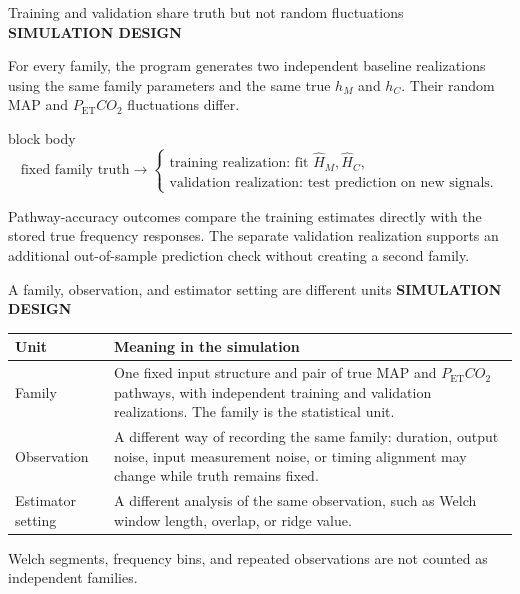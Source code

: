 \documentclass[aspectratio=169,11pt]{beamer}
\newcommand{\PETCOtwo}{P_{\mathrm{ET}}CO_2}
\newcommand{\sectionlabel}[1]{%
  {\color{Accent}\fontsize{8}{9.5}\selectfont\bfseries\MakeUppercase{#1}}\par\vspace{0.12cm}}
\newenvironment{equationcallout}
  {\begin{beamercolorbox}[rounded=true,sep=0.28cm,center,wd=0.94\textwidth]{block body}%
   \setbeamercolor{block body}{bg=AccentLight,fg=Ink}\large}
  {\end{beamercolorbox}}
\begin{document}
\begin{frame}{Training and validation share truth but not random fluctuations}
\sectionlabel{Simulation Design}
For every family, the program generates two independent baseline realizations
using the same family parameters and the same true $h_M$ and $h_C$. Their random
MAP and $\PETCOtwo$ fluctuations differ.

\vspace{0.16cm}
\begin{equationcallout}
\[
\text{fixed family truth}
\longrightarrow
\begin{cases}
\text{training realization: fit }\widehat H_M,\widehat H_C,\\
\text{validation realization: test prediction on new signals.}
\end{cases}
\]
\end{equationcallout}

\vspace{0.10cm}
Pathway-accuracy outcomes compare the training estimates directly with the stored
true frequency responses. The separate validation realization supports an
additional out-of-sample prediction check without creating a second family.
\end{frame}

\begin{frame}{A family, observation, and estimator setting are different units}
\sectionlabel{Simulation Design}
\fontsize{10.9}{13.2}\selectfont
\begin{tabular}{p{}p{}}
\toprule
\textbf{Unit} & \textbf{Meaning in the simulation}\\
\midrule
Family & One fixed input structure and pair of true MAP and $\PETCOtwo$ pathways, with independent training and validation realizations. The family is the statistical unit.\\[0.10cm]
Observation & A different way of recording the same family: duration, output noise, input measurement noise, or timing alignment may change while truth remains fixed.\\[0.10cm]
Estimator setting & A different analysis of the same observation, such as Welch window length, overlap, or ridge value.\\
\bottomrule
\end{tabular}

\vspace{0.12cm}
Welch segments, frequency bins, and repeated observations are not counted as
independent families.
\end{frame}
\end{document}
